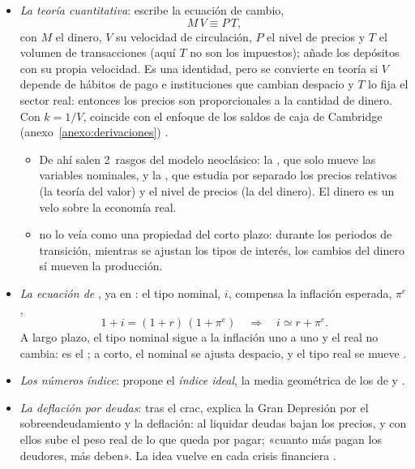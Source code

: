 \documentclass[11pt]{article}
\begin{document}
\begin{itemize}
\item \emph{La teoría cuantitativa}: \textcite{Fisher1911Purchasing} escribe la ecuación de cambio,
  \begin{equation}
  M\,V\equiv P\,T, \label{eq:cuantitativa}
  \end{equation}
  con $M$ el dinero, $V$ su velocidad de circulación, $P$ el nivel de precios y $T$ el volumen de transacciones (aquí $T$ no son los impuestos);  añade los depósitos con su propia velocidad. Es una identidad, pero se convierte en teoría si $V$ depende de hábitos de pago e instituciones que cambian despacio y $T$ lo fija el sector real: entonces los precios son proporcionales a la cantidad de dinero. Con $k=1/V$, coincide con el enfoque de los saldos de caja de Cambridge (anexo~\ref{anexo:derivaciones}) .
  \begin{itemize}
  \item De ahí salen 2~rasgos del modelo neoclásico: la , que solo mueve las variables nominales, y la , que estudia por separado los precios relativos (la teoría del valor) y el nivel de precios (la del dinero). El dinero es un velo sobre la economía real.
  \item {} no lo veía como una propiedad del corto plazo: durante los periodos de transición, mientras se ajustan los tipos de interés, los cambios del dinero sí mueven la producción\nocite{Fisher1911Purchasing}.
  \end{itemize}
\item \emph{La ecuación de }, ya en \textcite{Fisher1896Appreciation}: el tipo nominal, $i$, compensa la inflación esperada, $\pi^e$,
  \begin{equation}
  1+i=(1+r)\,(1+\pi^e)\quad\Rightarrow\quad i\simeq r+\pi^e. \label{eq:fisher}
  \end{equation}
  A largo plazo, el tipo nominal sigue a la inflación uno a uno y el real no cambia: es el ; a corto, el nominal se ajusta despacio, y el tipo real se mueve .
\item \emph{Los números índice}: \textcite{Fisher1922Making} propone el \emph{índice ideal}, la media geométrica de los de  y  .
\item \emph{La deflación por deudas}: tras el crac, explica la Gran Depresión por el sobreendeudamiento y la deflación: al liquidar deudas bajan los precios, y con ellos sube el peso real de lo que queda por pagar; «cuanto más pagan los deudores, más deben»\nocite{Fisher1933}. La idea vuelve en cada crisis financiera .
\end{itemize}
\end{document}
